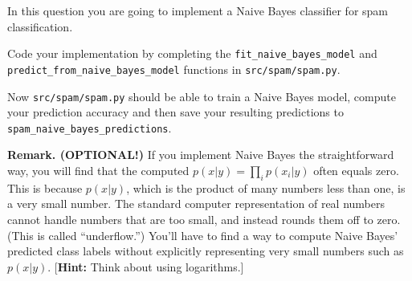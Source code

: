 \item {}
In this question you are going to implement a Naive Bayes classifier for spam
classification.

Code your implementation by completing the \texttt{fit\_naive\_bayes\_model}
and \\\texttt{predict\_from\_naive\_bayes\_model} functions in
\texttt{src/spam/spam.py}.

Now \texttt{src/spam/spam.py} should be able to train a Naive Bayes model,
compute your prediction accuracy and then save your resulting predictions
to \texttt{spam\_naive\_bayes\_predictions}.


{\bf Remark. (OPTIONAL!)} If you implement Naive Bayes the straightforward way, you will find
that the computed $p(x|y) = \prod_i p(x_i | y)$ often equals zero.  This is
because $p(x|y)$, which is the product of many numbers less than one, is a very
small  number. The standard computer representation of real numbers cannot
handle numbers that are too small, and instead rounds them off to zero.  (This
is called  ``underflow.'')  You'll have to find a way to compute Naive Bayes'
predicted  class labels without explicitly representing very small numbers such
as $p(x|y)$.
[\textbf{Hint:} Think about using logarithms.]\\[50pt]